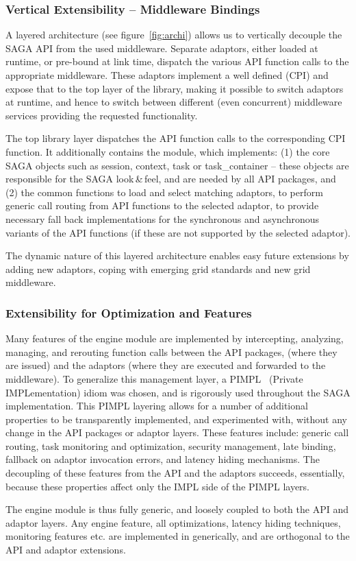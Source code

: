 \subsubsection{Vertical Extensibility -- Middleware Bindings}

  A layered architecture (see figure~\ref{fig:archi}) allows us to
  vertically decouple the SAGA API from the used middleware. Separate
  adaptors, either loaded at runtime, or pre-bound at link time,
  dispatch the various API function calls to the appropriate
  middleware. 
	These adaptors implement a well
  defined  (CPI) and expose that to the
  top layer of the library, making it possible to switch adaptors
  at runtime, and hence to switch between different (even concurrent)
  middleware services providing the requested functionality. 
  
  The top library layer dispatches the API function calls to the
  corresponding CPI function.  It additionally contains the  module, which implements: (1) the core SAGA objects such 
  as session, context, task or task\_container -- these objects are 
  responsible for the SAGA look\,\&\,feel, and are needed by all API 
  packages, and (2) the common functions to load and select matching 
  adaptors, to perform generic call routing from API functions to the 
  selected adaptor, to provide necessary fall back implementations 
  for the synchronous and asynchronous variants of the API functions 
  (if these are not supported by the selected adaptor).
	
	The dynamic nature of this layered architecture enables easy future 
	extensions by adding new adaptors, coping with emerging grid standards 
	and new grid middleware.
	

\subsubsection{Extensibility for Optimization and Features} 

  Many features of the engine module are implemented by intercepting,
  analyzing, managing, and rerouting function calls between the API packages,
  (where they are issued) and the adaptors (where they are executed
  and forwarded to the middleware).  To generalize this management
  layer, a PIMPL~\cite{pimpl} (Private IMPLementation) 
  idiom was chosen, and is rigorously
  used throughout the SAGA implementation.  This PIMPL layering allows
  for a number of additional properties to be transparently
  implemented, and experimen\-ted with, without any change in
  the API packages or adaptor layers.  These features
  include: generic call routing, task monitoring and optimization, 
  security management, late binding, fallback on adaptor invocation errors,
  and latency hiding mechanisms.
	The decoupling of these features from the API and 
  the adaptors succeeds, essentially, because these properties 
  affect only the IMPL side of the PIMPL layers.  

  The engine module is thus fully generic, and loosely coupled to
  both the API and adaptor layers.  Any engine feature, all
  optimizations, latency hiding techniques, monitoring features etc.
  are implemented in generically, and are orthogonal to
  the API and adaptor extensions.  
